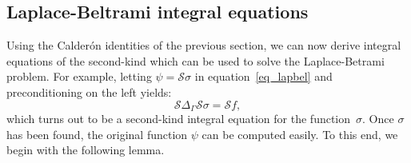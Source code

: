\documentclass[11pt]{article}
\newcommand{\surflap}{\Delta_\Gamma}
\newcommand{\cS}{\mathcal S}
\numberwithin{equation}{section}
\begin{document}
\subsection{Laplace-Beltrami integral equations}

Using the Calder\'on identities of the previous section, we can now
derive integral equations of the second-kind which can be used to
solve the Laplace-Betrami problem. For example, letting $\psi = \cS
\sigma$ in equation~\eqref{eq_lapbel} and preconditioning 
on the left yields:
\begin{equation}
\cS \surflap \cS \sigma = \cS f,
\end{equation}
which turns out to be a second-kind integral equation for the
function~$\sigma$. Once $\sigma$
has been found, the original 
function $\psi$ can be computed easily.
To this end, we begin with the following lemma.
\end{document}
